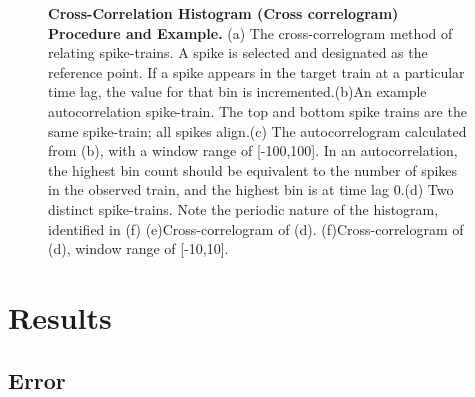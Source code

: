 \documentclass[11pt]{article}
\begin{document}
\begin{figure}[H]
\begin{minipage}{.49\linewidth}
\centering
{}
\end{minipage}
\begin{minipage}{.5\linewidth}
\centering
{}
\end{minipage}
\begin{minipage}{.49\linewidth}
\centering
{}
\end{minipage}
\begin{minipage}{.5\linewidth}
\centering
{}
\end{minipage}
\begin{minipage}{.49\linewidth}
\centering
{}
\end{minipage}
\begin{minipage}{.5\linewidth}
\centering
{}
\end{minipage}

\caption{\textbf{Cross-Correlation Histogram (Cross correlogram) Procedure and Example.} (a) The cross-correlogram method of relating spike-trains. A spike is selected and designated as the reference point. If a spike appears in the target train at a particular time lag, the value for that bin is incremented.(b)An example autocorrelation spike-train. The top and bottom spike trains are the same spike-train; all spikes align.(c) The autocorrelogram calculated from (b), with a window range of [-100,100]. In an autocorrelation, the highest bin count should be equivalent to the number of spikes in the observed train, and the highest bin is at time lag 0.(d) Two distinct spike-trains. Note the periodic nature of the histogram, identified in (f) (e)Cross-correlogram of (d). (f)Cross-correlogram of (d), window range of [-10,10].}
\label{fig:main}
\end{figure}

\section{Results}

\subsection{Error}
\end{document}
